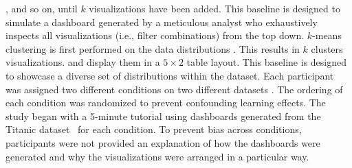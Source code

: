 ,
and so on,
until $k$ visualizations have been added.
This baseline is designed to simulate a dashboard
generated by a meticulous analyst who exhaustively
inspects all visualizations (i.e., filter combinations)
from the top down.
\stitle{\cluster:} 
$k$-means clustering is first performed on the data distributions
.
This results in $k$ clusters 
visualizations.
and display them in a $5\times2$ table layout.
This baseline is designed to showcase a diverse set of
distributions within the dataset.
\smallskip
{}
Each participant was assigned two different
conditions on two different datasets
.
The ordering of each condition was
randomized to prevent confounding learning effects.
The study began with a 5-minute tutorial
using dashboards generated from the Titanic dataset~\cite{titanic}
for each condition.
To prevent bias across conditions,
participants were not provided an explanation of
how the dashboards were generated and
why the visualizations were arranged in a particular way.

